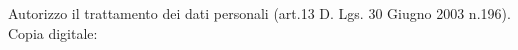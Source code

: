 \documentclass[10pt,a4paper]{altacv}
\begin{document}
\vspace{\fill}

\begin{fullwidth}
\small
	\begin{center}
		Autorizzo il trattamento dei dati personali (art.13 D. Lgs. 30 Giugno 2003 n.196).\\
		Copia digitale: \url{} 
	\end{center}
\end{fullwidth}








\end{document}
